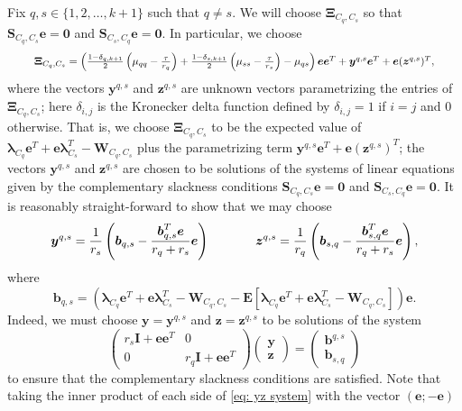 \documentclass[twoside,11pt]{article}
\renewcommand{\S}{\mathbf{S}}
\newcommand{\E}{\mathbf{E}}
\renewcommand{\b}{{\bs{b}}}
\newcommand{\e}{\bs {e}}
\newcommand{\bs}{\boldsymbol}
\newcommand{\y}{\bs {y}}
\newcommand{\W}{\bs {W}}
\newcommand{\z}{\bs{z}}
\newcommand{\0}{\bs{0}}
\newcommand{\vect}[1] {\ensuremath{\left(\begin{array}{c} #1 \end{array} \right)}} %
\newcommand{\mat}[1] {\ensuremath{ \left(\begin{array} #1 \end{array} \right)}} %
\newcommand{\sbra}[1] {\ensuremath{ \left[ #1\right]}} %
\newcommand{\rbra}[1]{\ensuremath{\left( #1 \right)}} %
\begin{document}
{%
Fix \(q, s \in \{1,2,\dots, k+1\}\) such that \(q\neq s\).
We will choose \(\bs \Xi_{C_q, C_s} \) so that \(\S_{C_q, C_s}\e = \bs 0\) and \( \S_{C_s, C_q} \e = \bs 0 \).
In particular, we choose
\begin{equation} \label{eq: Xi choice 1}
	\resizebox{0.92\hsize}{!}{$
\bs\Xi_{C_q, C_s} = \rbra{ \frac{1-\delta_{q, k+1}}{2}
\rbra{\mu_{qq} - \frac{\tau}{r_q}} +
\frac{1-\delta_{s, k+1}}{2}
\rbra{\mu_{ss} - \frac{\tau}{r_s}} - \mu_{qs}} \e\e^T
+ \y^{q,s} \e^T + \e (\z^{q,s})^T,
$}
\end{equation}
where the vectors \( \y^{q,s}\) and \(\z^{q,s}\) are unknown vectors parametrizing the entries of \(\bs\Xi_{C_q, C_s}\);
here
\(\delta_{i,j}\) is the Kronecker delta function defined by \( \delta_{i,j} = 1 \) if \(i=j\)
	and \(0\) otherwise.
That is, we choose \(\bs\Xi_{C_q, C_s} \) to be the expected value of
\( \bs \lambda_{C_q} \e^T + \e \bs \lambda_{C_s}^T
- \W_{C_q, C_s} \) plus the parametrizing term \(\y^{q,s} \e^T + \e (\z^{q,s})^T\); the vectors
\( \y^{q,s}\) and \(\z^{q,s}\) are chosen to be solutions of the systems of linear equations given
by the complementary slackness conditions
\(\S_{C_q, C_s}\e = \bs 0\) and \( \S_{C_s, C_q} \e = \bs 0 \).
It is reasonably straight-forward to show that we may choose
\begin{equation} \label{eq: y z}
\y^{q,s} = \frac{1}{r_s} \rbra{ \b_{q,s} - \frac{\b_{q,s}^T \e }{r_q + r_s} \e }
\hspace{0.5in}
\z^{q,s} = \frac{1}{r_q} \rbra{ \b_{s,q} - \frac{\b_{s,q}^T \e}{r_q + r_s} \e },
\end{equation}
where
\begin{equation} \label{eq: b}
\b_{q,s} = \rbra{ \bs \lambda_{C_q} \e^T + \e \bs \lambda_{C_s}^T
- \W_{C_q, C_s} - \E\sbra{\bs \lambda_{C_q} \e^T + \e \bs \lambda_{C_s}^T
- \W_{C_q, C_s}} } \e.
\end{equation}
Indeed, we must choose $\y = \y^{q,s}$ and $\z = \z^{q,s}$
to be solutions of the system
\newcommand{\I}{\bs I}
\begin{equation} \label{eq: yz system}
	\mat{{cc} r_s \I + \e\e^T & 0 \\ 0 & r_q \I + \e\e^T }
	\vect{ \y \\ \z } = \vect{\b^{q,s} \\ \b_{s,q} }
\end{equation}
to ensure that the complementary slackness conditions are satisfied.
Note that taking the inner product of each side
of \eqref{eq: yz system} with the vector \( (\e; -\e) \)
}
\end{document}
